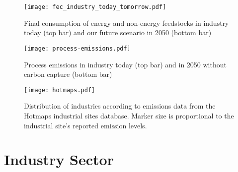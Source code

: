 \begin{SCfigure}
    \texttt{[image: fec\_industry\_today\_tomorrow.pdf]}
    \caption{Final consumption of energy and non-energy feedstocks in industry today (top bar) and
    our future scenario in 2050 (bottom bar)}
    \label{fig:fec-industry}
\end{SCfigure}

\begin{SCfigure}
    \texttt{[image: process-emissions.pdf]}
    \caption{Process emissions in industry today (top bar) and in 2050 without carbon capture (bottom bar)}
    \label{fig:process-emissions}
\end{SCfigure}


\begin{SCfigure}
    \texttt{[image: hotmaps.pdf]}
    \caption{Distribution of industries according to emissions data from the Hotmaps industrial sites database. Marker size is proportional to the industrial site's reported emission levels.}
    \label{fig:hotmaps}
\end{SCfigure}


\section{Industry Sector}
\label{sec:si:industry}

